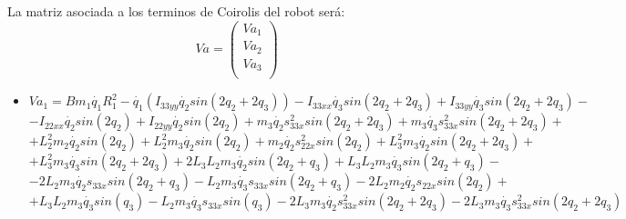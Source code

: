 La matriz asociada a los terminos de Coirolis del robot será:
\[
Va=
\begin{pmatrix}
Va_{1}\\
Va_{2}\\
Va_{3}\\
\end{pmatrix} \]
\begin{itemize}
	\item $Va_{1}=Bm_{1}\dot{q_{1}}R_{1}^{2} -\dot{q_{1}}(I_{33yy}\dot{q_{2}} sin(2q_{2}+2q_{3})) -I_{33xx}\dot{q_{3}} sin(2q_{2}+2q_{3}) +I_{33yy}\dot{q_{3}}sin(2q_{2}+2q_{3})- $ \\ \vspace{0.1cm}
	$ -I_{22xx}\dot{q_{2}} sin(2q_{2}) +I_{22yy}\dot{q_{2}} sin(2q_{2}) +  m_{3}\dot{q_{2}}s_{33x}^{2}sin(2q_{2}+2q_{3}) + m_{3}\dot{q_{3}}s_{33x}^{2}sin(2q_{2}+2q_{3}) +$ \\ \vspace{0.1cm}
  $  +L_{2}^{2}m_2 \dot{q_{2}}sin(2q_{2}) + L_{2}^{2}m_{3}\dot{q_{2}}sin( 2q_{2}) +  m_{2}\dot{q_{2}}s_{22x}^{2}sin(2q_{2}) +L_{3}^{2}m_{3} \dot{q_{2}}sin(2q_{2}+2q_{3}) +$ \\ \vspace{0.1cm}
	$ + L_{3}^{2}m_{3} \dot{q_{3}}sin(2q_{2}+2q_{3}) +  2L_{3}L_{2}m_{3} \dot{q_{2}}sin(2q_{2}+q_{3}) +L_{3}L_{2}m_{3} \dot{q_{3}}sin(2q_{2}+q_{3}) - $ \\ \vspace{0.1cm}
	$ -2L_{2}m_{3}\dot{q_{2}}s_{33x}sin(2q_{2}+q_{3})- L_{2}m_{3}\dot{q_{3}}s_{33x}sin(2q_{2}+q_{3}) -2L_{2}m_{2}\dot{q_{2}}s_{22x}sin(2q_{2}) +$ \\ \vspace{0.1cm}
	$ +L_{3}L_{2}m_{3} \dot{q_{3}}sin(q_{3}) -L_{2}m_{3} \dot{q_{3}}s_{33x}sin(q_{3}) -2L_{3}m_{3}\dot{q_{2}}s_{33x}^{2}sin(2q_{2}+2q_{3}) - 2L_{3}m_{3}\dot{q_{3}}s_{33x}^{2}sin(2q_{2}+2q_{3})  $ \\ \vspace{0.2cm}


\end{itemize}

